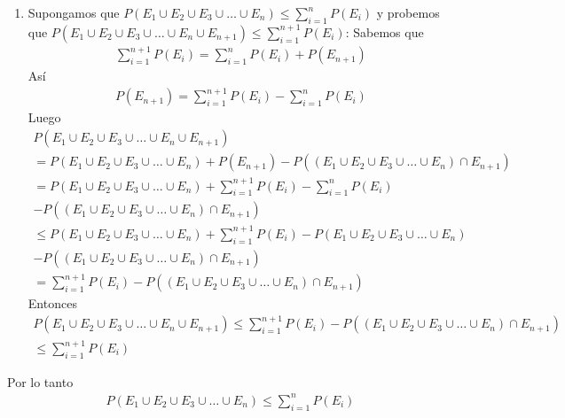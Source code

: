 \begin{enumerate}
\begin{enumerate}
        \item Supongamos que $P(E_1 \cup E_2 \cup E_3 \cup \ldots \cup E_n) \leq \sum_{i=1}^{n} P(E_i)$ y probemos que $P(E_1 \cup E_2 \cup E_3 \cup \ldots \cup E_n \cup E_{n + 1}) \leq \sum_{i=1}^{n + 1} P(E_i)$:
        Sabemos que
        \begin{gather*}
            \sum_{i=1}^{n + 1} P(E_i) = \sum_{i=1}^{n} P(E_i) + P(E_{n + 1})
        \end{gather*}
        Así
        \begin{gather*}
            P(E_{n + 1}) = \sum_{i=1}^{n + 1} P(E_i) - \sum_{i=1}^{n} P(E_i)
        \end{gather*}
        Luego
        \begin{gather*}
            P(E_1 \cup E_2 \cup E_3 \cup \ldots \cup E_n \cup E_{n + 1}) \\
            = P(E_1 \cup E_2 \cup E_3 \cup \ldots \cup E_n) + P(E_{n + 1}) - P((E_1 \cup E_2 \cup E_3 \cup \ldots \cup E_n) \cap E_{n + 1}) \\
            = P(E_1 \cup E_2 \cup E_3 \cup \ldots \cup E_n) + \sum_{i=1}^{n + 1} P(E_i) - \sum_{i=1}^{n} P(E_i) \\
            - P((E_1 \cup E_2 \cup E_3 \cup \ldots \cup E_n) \cap E_{n + 1}) \\
            \leq P(E_1 \cup E_2 \cup E_3 \cup \ldots \cup E_n) + \sum_{i=1}^{n + 1} P(E_i) - P(E_1 \cup E_2 \cup E_3 \cup \ldots \cup E_n) \\
            - P((E_1 \cup E_2 \cup E_3 \cup \ldots \cup E_n) \cap E_{n + 1}) \\
            = \sum_{i=1}^{n + 1} P(E_i) - P((E_1 \cup E_2 \cup E_3 \cup \ldots \cup E_n) \cap E_{n + 1})
    	\end{gather*}
        Entonces
        \begin{gather*}
            P(E_1 \cup E_2 \cup E_3 \cup \ldots \cup E_n \cup E_{n + 1}) \leq \sum_{i=1}^{n + 1} P(E_i) - P((E_1 \cup E_2 \cup E_3 \cup \ldots \cup E_n) \cap E_{n + 1}) \\
            \leq \sum_{i=1}^{n + 1} P(E_i)
        \end{gather*}
    \end{enumerate}
    Por lo tanto
    \begin{gather*}
        P(E_1 \cup E_2 \cup E_3 \cup \ldots \cup E_n) \leq \sum_{i=1}^{n} P(E_i)
    \end{gather*}
	

\end{enumerate}
